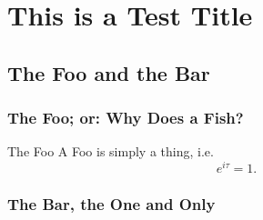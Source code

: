 \documentclass[a4paper]{book}
\begin{document}
\setcounter{chapter}{2}
\chapter{This is a Test Title}
\section{The Foo and the Bar}
\subsection{The Foo; or: Why Does a Fish?}
\Blindtext
\begin{definition}{The Foo}{}
	A Foo is simply a thing, i.e.
	\begin{equation}
		e^{i\tau} = 1.
		\label{eq:a thing}
	\end{equation}
\end{definition}
\subsection{The Bar, the One and Only}
\blindtext[6]
\end{document}
